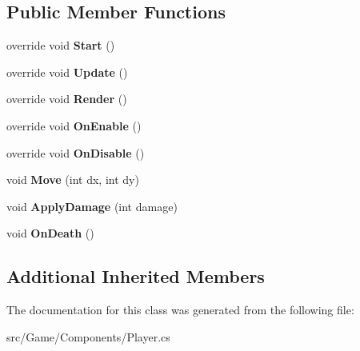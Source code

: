 \subsection*{Public Member Functions}
\begin{DoxyCompactItemize}
\item 
\mbox{\label{class_game_1_1_components_1_1_player_ae996f7b3c2a6434e07ddb7bba59fb8cc}} 
override void {\bfseries Start} ()
\item 
\mbox{\label{class_game_1_1_components_1_1_player_afdf089af59c27adb11135a2aa0bd6d82}} 
override void {\bfseries Update} ()
\item 
\mbox{\label{class_game_1_1_components_1_1_player_a7b96fcfa280c3d04459ca4d3bfe27f64}} 
override void {\bfseries Render} ()
\item 
\mbox{\label{class_game_1_1_components_1_1_player_a42ef5b1e74faa75f955758eb83a45ed4}} 
override void {\bfseries On\+Enable} ()
\item 
\mbox{\label{class_game_1_1_components_1_1_player_a77dcd93c47d77201b83eefcb1bc79104}} 
override void {\bfseries On\+Disable} ()
\item 
\mbox{\label{class_game_1_1_components_1_1_player_a224dce2f4af9381dcd34d3f91571b8e3}} 
void {\bfseries Move} (int dx, int dy)
\item 
\mbox{\label{class_game_1_1_components_1_1_player_acfecb95f166bf3cb0c6906491d602b5a}} 
void {\bfseries Apply\+Damage} (int damage)
\item 
\mbox{\label{class_game_1_1_components_1_1_player_a267d9db6071a2aa43becb5b200de6bb5}} 
void {\bfseries On\+Death} ()
\end{DoxyCompactItemize}
\subsection*{Additional Inherited Members}


The documentation for this class was generated from the following file\+:\begin{DoxyCompactItemize}
\item 
src/\+Game/\+Components/Player.\+cs\end{DoxyCompactItemize}
